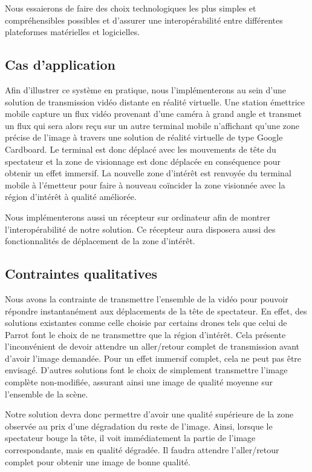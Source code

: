 \documentclass[11pt,a4paper]{article}
\begin{document}
\bigbreak
Nous essaierons de faire des choix technologiques les plus simples et compréhensibles possibles et d'assurer une interopérabilité entre différentes plateformes matérielles et logicielles.

\subsection{Cas d'application}

Afin d'illustrer ce système en pratique, nous l'implémenterons au sein d'une solution de transmission vidéo distante en réalité virtuelle.
Une station émettrice mobile capture un flux vidéo provenant d'une caméra à grand angle et transmet un flux qui sera alors reçu sur un autre terminal mobile n'affichant qu'une zone précise de l'image à travers une solution de réalité virtuelle de type Google Cardboard.
Le terminal est donc déplacé avec les mouvements de tête du spectateur et la zone de visionnage est donc déplacée en conséquence pour obtenir un effet immersif.
La nouvelle zone d’intérêt est renvoyée du terminal mobile à l'émetteur pour faire à nouveau coïncider la zone visionnée avec la région d'intérêt à qualité améliorée.

\bigbreak
Nous implémenterons aussi un récepteur sur ordinateur afin de montrer l'interopérabilité de notre solution.
Ce récepteur aura disposera aussi des fonctionnalités de déplacement de la zone d'intérêt.

\subsection{Contraintes qualitatives}

Nous avons la contrainte de transmettre l’ensemble de la vidéo pour pouvoir répondre instantanément aux déplacements de la tête de spectateur.
En effet, des solutions existantes comme celle choisie par certains drones tels que celui de Parrot font le choix de ne transmettre que la région d’intérêt. Cela présente l’inconvénient de devoir attendre un aller/retour complet de transmission avant d’avoir l’image demandée. Pour un effet immersif complet, cela ne peut pas être envisagé.
D’autres solutions font le choix de simplement transmettre l’image complète non-modifiée, assurant ainsi une image de qualité moyenne sur l’ensemble de la scène.

\bigbreak
Notre solution devra donc permettre d’avoir une qualité supérieure de la zone observée au prix d’une dégradation du reste de l’image.
Ainsi, lorsque le spectateur bouge la tête, il voit immédiatement la partie de l’image correspondante, mais en qualité dégradée. Il faudra attendre l’aller/retour complet pour obtenir une image de bonne qualité.
\end{document}
